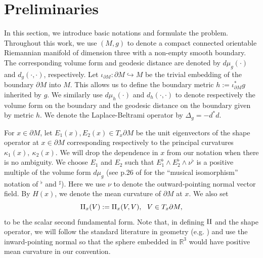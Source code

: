 \documentclass[12pt,a4paper]{amsart}
\numberwithin{equation}{section}
\theoremstyle{plain}
\theoremstyle{definition}
\newcommand{\R}{\mathbb{R}}
\newcommand{\II}{{\rm{II}}}
\newcommand{\D}{\mathbb{D}}
\begin{document}

	
	
	\section{Preliminaries}\label{notations}
	In this section, we introduce basic notations and formulate the problem. Throughout this work, we use $(M, g)$ to denote a compact connected orientable Riemannian manifold of dimension three with a non-empty smooth boundary. The corresponding volume form and geodesic distance are denoted by $d\mu_g(\cdot)$ and $d_g(\cdot,\cdot)$, respectively. Let $\iota_{\partial M}: \partial M \hookrightarrow M$ be the trivial embedding of the boundary $\partial M$ into $M$. This allows us to define the boundary metric $h := \iota_{\partial M}^*g$ inherited by $g$. We similarly use $d\mu_h(\cdot)$ and $d_h(\cdot,\cdot)$ to denote respectively the volume form on the boundary and the geodesic distance on the boundary given by metric $h$. We denote the Laplace-Beltrami operator by $\Delta_g = -d^*d$.
	
	For $x\in \partial M$, let $E_1(x), E_2(x) \in T_{x}\partial M$ be the unit eigenvectors of the shape operator at $x\in \partial M$ corresponding respectively to the principal curvatures $\kappa_1(x),\ \kappa_2(x)$. We will drop the dependence in $x$ from our notation when there is no ambiguity. We choose $E_1$ and $E_2$ such that $E_1^\flat\wedge E_2^\flat\wedge\nu^\flat$ is a positive multiple of the volume form $ d\mu_g$ (see p.26 of \cite{lee} for the ``musical isomorphism'' notation of $^\flat$ and $^\sharp$). Here we use $\nu$ to denote the outward-pointing normal vector field. By $H(x)$, we denote the mean curvature of $\partial M$ at $x$. We also set 
	$$\II_x(V) := \II_x(V,V),\ \ V\in T_x\partial M,$$
	to be the scalar second fundamental form. Note that, in defining $\II$ and the shape operator, we will follow the standard literature in geometry (e.g. \cite{lee}) and use the inward-pointing normal so that the sphere embedded in $\R^3$ would have positive mean curvature in our convention.
	
\end{document}
